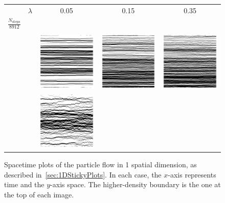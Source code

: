 \begin{figure} \caption[The flow pattern of sticky particles in $1$D]{Spacetime plots of the particle flow
in 1 spatial dimension, as described in~\ref{sec:1DStickyPlots}. In each case, the $x$-axis represents time
and the $y$-axis space. The higher-density boundary is the one at the top of each image.} \renewcommand{\arraystretch}{-0.5}
\label{fig:1DStickyPlots}
\begin{center}
\begin{tabular}{c @{\hskip -0.5em} c| c @{\hskip -0.5em} c @{\hskip -0.5em} c} 
 & $\lambda$ & 0.05 & 0.15 & 0.35 \\
 $\frac{N_\mathrm{steps}}{8912}$ & & & &  \\ 
 \hline
 \rule{0pt}{0.1\normalbaselineskip} & & & & \\
 \raisebox{5em}{1}  &  & \includegraphics[width=0.31\linewidth]{numerics/images/stickyParticleFlows/flowImpL0p05T1p32.png}
 & \includegraphics[width=0.31\linewidth]{numerics/images/stickyParticleFlows/flowImpL0p15T1p32.png} 
 & \includegraphics[width=0.31\linewidth]{numerics/images/stickyParticleFlows/flowImpL0p35T1p32.png} \\ 
\raisebox{5em}{32} & & \includegraphics[width=0.31\linewidth]{numerics/images/stickyParticleFlows/flowImpL0p05T1p0.png} 

\end{tabular}
\end{center}
\end{figure}
